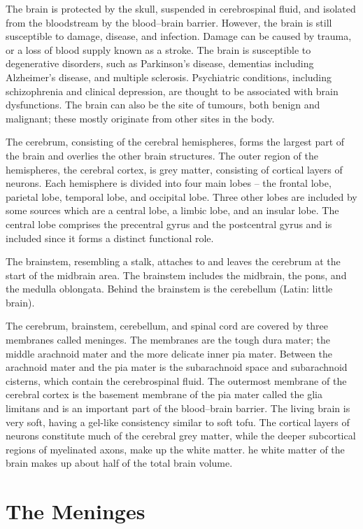 \documentclass[]{book}
\begin{document}
The brain is protected by the skull, suspended in cerebrospinal fluid, and isolated from the bloodstream by the blood--brain barrier. However, the brain is still susceptible to damage, disease, and infection. Damage can be caused by trauma, or a loss of blood supply known as a stroke. The brain is susceptible to degenerative disorders, such as Parkinson's disease, dementias including Alzheimer's disease, and multiple sclerosis. Psychiatric conditions, including schizophrenia and clinical depression, are thought to be associated with brain dysfunctions. The brain can also be the site of tumours, both benign and malignant; these mostly originate from other sites in the body.

The cerebrum, consisting of the cerebral hemispheres, forms the largest part of the brain and overlies the other brain structures. The outer region of the hemispheres, the cerebral cortex, is grey matter, consisting of cortical layers of neurons. Each hemisphere is divided into four main lobes -- the frontal lobe, parietal lobe, temporal lobe, and occipital lobe. Three other lobes are included by some sources which are a central lobe, a limbic lobe, and an insular lobe. The central lobe comprises the precentral gyrus and the postcentral gyrus and is included since it forms a distinct functional role.

The brainstem, resembling a stalk, attaches to and leaves the cerebrum at the start of the midbrain area. The brainstem includes the midbrain, the pons, and the medulla oblongata. Behind the brainstem is the cerebellum (Latin: little brain).

The cerebrum, brainstem, cerebellum, and spinal cord are covered by three membranes called meninges. The membranes are the tough dura mater; the middle arachnoid mater and the more delicate inner pia mater. Between the arachnoid mater and the pia mater is the subarachnoid space and subarachnoid cisterns, which contain the cerebrospinal fluid. The outermost membrane of the cerebral cortex is the basement membrane of the pia mater called the glia limitans and is an important part of the blood--brain barrier. The living brain is very soft, having a gel-like consistency similar to soft tofu. The cortical layers of neurons constitute much of the cerebral grey matter, while the deeper subcortical regions of myelinated axons, make up the white matter. he white matter of the brain makes up about half of the total brain volume.

\hypertarget{the-meninges}{%
\section{The Meninges}\label{the-meninges}}
\end{document}
